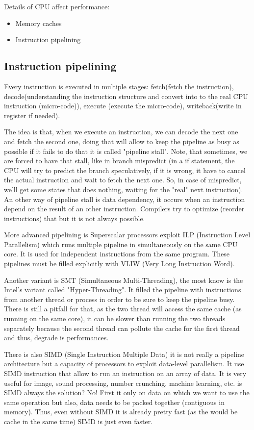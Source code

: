 Details of CPU affect performance:
\begin{itemize}
    \item Memory caches
    \item Instruction pipelining
\end{itemize}

\subsection{Instruction pipelining}
Every instruction is executed in multiple stages: fetch(fetch the instruction),
decode(understanding the instruction structure and convert into to the real CPU
instruction (micro-code)), execute (execute the micro-code), writeback(write in
register if needed).

The idea is that, when we execute an instruction, we can decode the next one and
fetch the second one, doing that will allow to keep the pipeline as busy as
possible if it fails to do that it is called "pipeline stall". Note, that
sometimes, we are forced to have that stall, like in branch mispredict (in a if
statement, the CPU will try to predict the branch speculatively, if it is wrong,
it have to cancel the actual instruction and wait to fetch the next one. So, in
case of mispredict, we'll get some states that does nothing, waiting for the
"real" next instruction). An other way of pipeline stall is data dependency, it
occurs when an instruction depend on the result of an other instruction.
Compilers try to optimize (reorder instructions) that but it is not always
possible.


More advanced pipelining is Superscalar processors exploit ILP (Instruction
Level Parallelism) which runs multiple pipeline in simultaneously on the same
CPU core. It is used for independent instructions from the same program. These
pipelines must be filled explicitly with VLIW (Very Long Instruction Word).


Another variant is SMT (Simultaneous Multi-Threading), the most know is the
Intel's variant called "Hyper-Threading". It filled the pipeline with
instructions from another thread or process in order to be sure to keep the
pipeline busy. There is still a pitfall for that, as the two thread will access
the same cache (as running on the same core), it can be slower than running the
two threads separately because the second thread can pollute the cache for the
first thread and thus, degrade is performances.


There is also SIMD (Single Instruction Multiple Data) it is not really a
pipeline architecture but a capacity of processors to exploit data-level
parallelism. It use SIMD instruction that allow to run an instruction on an
array of data. It is very useful for image, sound processing, number crunching,
machine learning, etc. is SIMD always the solution? No! First it only on data on
which we want to use the same operation but also, data needs to be packed
together (contiguous in memory). Thus, even without SIMD it is already pretty
fast (as the would be cache in the same time) SIMD is just even faster.

